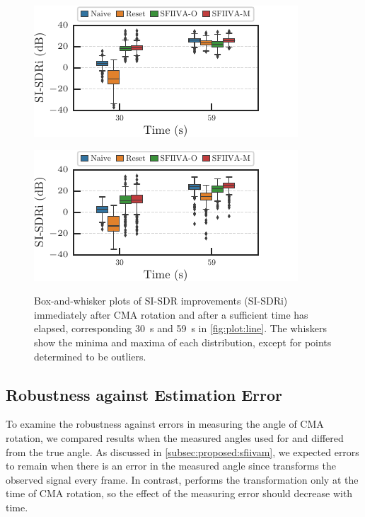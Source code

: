 \documentclass[sip,biber]{now-journal}
\begin{document}
\begin{figure}[t]
  \begin{minipage}[t]{.45\textwidth}
    \centering\includegraphics{figures/plots/online/box_980.pdf}\label{fig:plot:box:980}
  \end{minipage}
  \begin{minipage}[t]{.45\textwidth}
    \centering\includegraphics{figures/plots/online/box_990.pdf}\label{fig:plot:box:990}
  \end{minipage}
  \caption{%
    Box-and-whisker plots of SI-SDR improvements (SI-SDRi) immediately after CMA rotation and after a sufficient time has elapsed, corresponding \SI{30}{\second} and \SI{59}{\second} in \cref{fig:plot:line}.
    The whiskers show the minima and maxima of each distribution, except for points determined to be outliers.
  }%
  \label{fig:plot:box}
\end{figure}

\subsection{Robustness against Estimation Error}

To examine the robustness against errors in measuring the angle of CMA rotation, we compared results when the measured angles used for \SFIIVAo{} and \SFIIVAm{} differed from the true angle.
As discussed in \cref{subsec:proposed:sfiivam}, we expected errors to remain when there is an error in the measured angle since \SFIIVAo{} transforms the observed signal every frame.
In contrast, \SFIIVAm{} performs the transformation only at the time of CMA rotation, so the effect of the measuring error should decrease with time.
\end{document}
